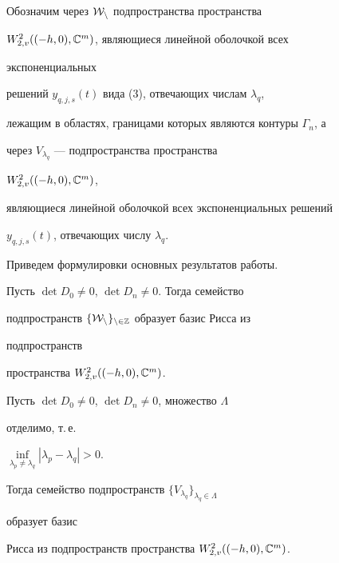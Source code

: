  


Обозначим через $\cal W_n$ подпространства пространства 


$W^{2}_{2,v}((-h,0),\Bbb C^m)$, являющиеся линейной оболочкой всех 


экспоненциальных 


решений $y_{q,j,s}(t)$ вида (3), отвечающих числам $\lambda_q$, 


лежащим в областях, границами которых являются контуры $\Gamma_n$, а 


через $V_{\lambda_q}$ --- подпространства пространства 


$W^{2}_{2,v}((-h,0),\Bbb C^m)$, 


являющиеся линейной оболочкой всех экспоненциальных решений 


$y_{q,j,s}(t)$, отвечающих числу $\lambda_q$. 


 


Приведем формулировки основных результатов работы. 


 


\begin{thm} 


Пусть $\det D_0\ne0$, $\det D_n\ne0$. Тогда семейство 


подпространств $\{\cal W_n\}_{n\in\Bbb Z}$ образует базис Рисса из 


подпространств 


пространства $W^{2}_{2,v}((-h,0),\Bbb C^m)$. 


\end{thm} 


 


\begin{thm} 


Пусть $\det D_0\ne0$, $\det D_n\ne0$, множество $\Lambda$ 


отделимо, т.\,е. 


$\inf\limits_{\lambda_p\ne\lambda_q}|\lambda_p-\lambda_q|>0$. 


Тогда семейство подпространств $\{V_{\lambda_q}\}_{\lambda_q\in\Lambda}$ 


образует базис 


Рисса из подпространств пространства $W^{2}_{2,v}((-h,0),\Bbb C^m)$. 


\end{thm} 


 


